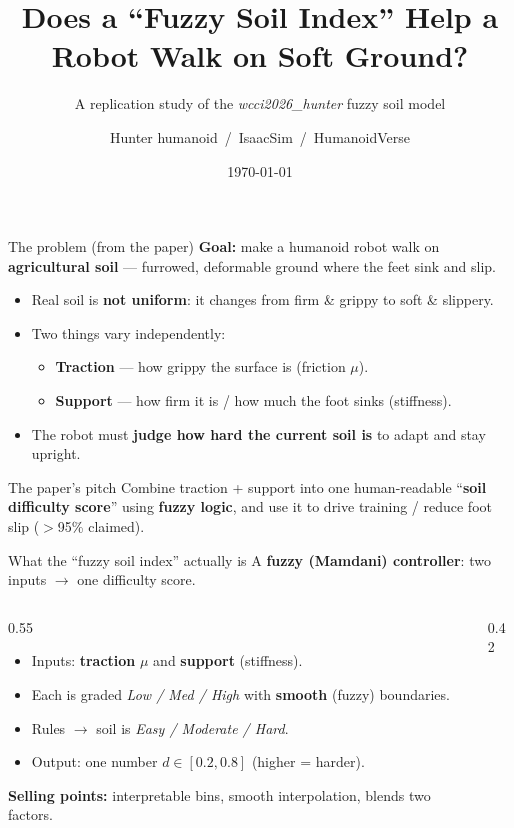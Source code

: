 \documentclass[aspectratio=169]{beamer}
\title[Fuzzy Soil Index — Replication]{Does a ``Fuzzy Soil Index'' Help a Robot Walk on Soft Ground?}
\subtitle{A replication study of the \textit{wcci2026\_hunter} fuzzy soil model}
\author{Hunter humanoid \,/\, IsaacSim \,/\, HumanoidVerse}
\date{\today}
\begin{document}
\frame{\titlepage}

\begin{frame}{The problem (from the paper)}
  \textbf{Goal:} make a humanoid robot walk on \textbf{agricultural soil} — furrowed,
  deformable ground where the feet sink and slip.
  \begin{itemize}
    \item Real soil is \textbf{not uniform}: it changes from firm \& grippy to soft \& slippery.
    \item Two things vary independently:
      \begin{itemize}
        \item \textbf{Traction} — how grippy the surface is (friction $\mu$).
        \item \textbf{Support} — how firm it is / how much the foot sinks (stiffness).
      \end{itemize}
    \item The robot must \textbf{judge how hard the current soil is} to adapt and stay upright.
  \end{itemize}
  \vfill
  \begin{block}{The paper's pitch}
    Combine traction + support into one human-readable ``\textbf{soil difficulty score}''
    using \textbf{fuzzy logic}, and use it to drive training / reduce foot slip ($>$95\% claimed).
  \end{block}
\end{frame}

\begin{frame}{What the ``fuzzy soil index'' actually is}
  A \textbf{fuzzy (Mamdani) controller}: two inputs $\to$ one difficulty score.
  \begin{columns}
    \begin{column}{0.55\textwidth}
      \begin{itemize}
        \item Inputs: \textbf{traction} $\mu$ and \textbf{support} (stiffness).
        \item Each is graded \textit{Low / Med / High} with \textbf{smooth} (fuzzy) boundaries.
        \item Rules $\to$ soil is \textit{Easy / Moderate / Hard}.
        \item Output: one number $d\in[0.2,0.8]$ (higher = harder).
      \end{itemize}
      \textbf{Selling points:} interpretable bins, smooth interpolation, blends two factors.
    \end{column}
    \begin{column}{0.42\textwidth}
      \centering
    \end{column}
  \end{columns}
\end{frame}
\end{document}
